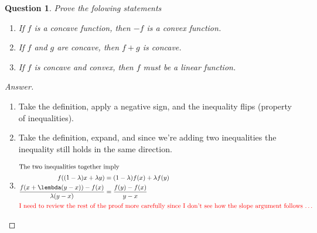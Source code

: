 \documentclass[11pt]{article}
\newtheorem{question}{Question}
\newcommand{\rd}{\textcolor{red}}
\begin{document}
\begin{question}
Prove the folowing statements
\begin{enumerate}
\item If $f$ is a concave function, then $-f$ is a convex function.
\item If $f$ and $g$ are concave, then $f + g$ is concave.
\item If $f$ is concave and convex, then $f$ must be a linear function.
\end{enumerate}
\end{question}
\begin{proof}[Answer]
\begin{enumerate}
\item Take the definition, apply a negative sign, and the inequality flips (property of inequalities).
\item Take the definition, expand, and since we're adding two inequalities the inequality still holds in the same direction.
\item
\begin{align*}
\intertext{The two inequalities together imply}
f((1 - \lambda)x + \lambda y) &= (1 - \lambda)f(x) + \lambda f(y)\\
\frac{f(x + \lembda(y - x)) - f(x)}{\lambda(y - x)} &= \frac{f(y) - f(x)}{y - x}\\
\intertext{\rd{I need to review the rest of the proof more carefully since I don't see how the slope argument follows \ldots}}
\end{align*}
\end{enumerate}
\end{proof}
\end{document}
